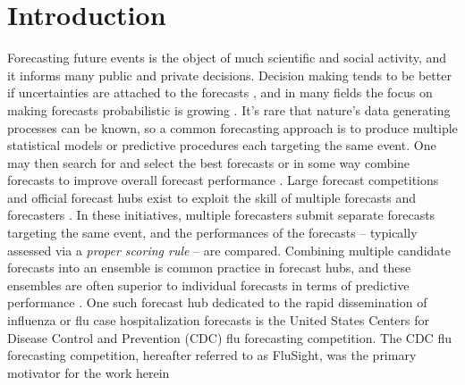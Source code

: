 \section{Introduction}
Forecasting future events is the object of much scientific and social activity, 
and it informs many public and private decisions. Decision making tends to be 
better if uncertainties are attached to the forecasts 
\cite[]{ramos2013probabilistic,joslyn2012uncertainty}, and in many fields the 
focus on making forecasts probabilistic is growing 
\cite[]{wang2023forecast,hong2020energy,kapetanios2015generalised,
gneiting2014probabilistic,collins2007ensembles,palmer2002economic}. 
It's rare that nature's data generating processes can be known, so a common 
forecasting approach is to produce multiple statistical models or predictive 
procedures each targeting the same event. One may then search for and select 
the best forecasts or in some way combine forecasts to improve overall 
forecast performance
\cite[]{yao2018using,clyde2013bayesian,biggerstaff2016results,
bernardo1994bayesian}. Large forecast competitions and official forecast 
hubs exist to exploit the skill of multiple forecasts and forecasters 
\cite[]{mathis2024evaluation,Cramer2022-hub-dataset,hyndman2020brief,
makridakis2020m4,reich2019collaborative,biggerstaff2016results,
hong2016probabilistic}. In these initiatives, multiple forecasters submit 
separate forecasts targeting the same event, and the performances of the 
forecasts -- typically assessed via a \textit{proper scoring rule} -- are 
compared.
Combining multiple candidate forecasts into an ensemble is common 
practice in forecast hubs, and these ensembles are often superior 
to individual forecasts in terms of predictive performance
\cite[]{wang2023forecast,
li2023bayesian,gyamerah2020probabilistic,li2019combining,
reich2019collaborativeens}. One such forecast hub dedicated to the rapid
dissemination of influenza or flu 
case hospitalization forecasts is the United States
Centers for Disease Control and Prevention (CDC) flu forecasting competition.
The CDC flu forecasting competition, hereafter referred to as FluSight, was the
primary motivator for the work herein

